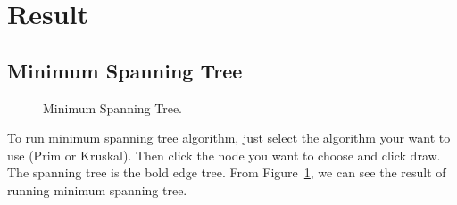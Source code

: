 \documentclass{article}
\begin{document}
\section{Result}
\subsection{Minimum Spanning Tree}
\begin{figure}[htb]
\centering
{}
   \caption{Minimum Spanning Tree.}
   \label{fig:minimum spanning tree}
\end{figure}
To run minimum spanning tree algorithm, just select the algorithm your want to use (Prim or Kruskal). Then click the node you want to choose and click draw. The spanning tree is the bold edge tree. From Figure~\ref{fig:minimum spanning tree}, we can see the result of running minimum spanning tree.\\
\end{document}
